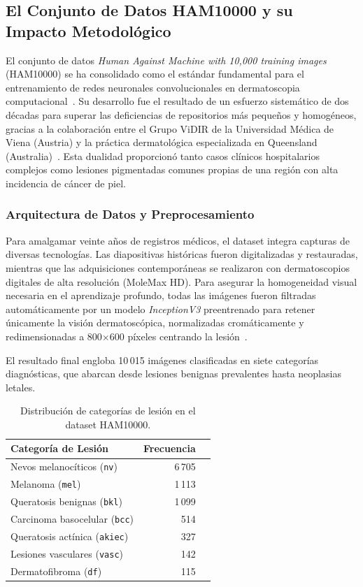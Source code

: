 \subsection{El Conjunto de Datos HAM10000 y su Impacto Metodológico}\label{sec:ham10000}

El conjunto de datos \textit{Human Against Machine with 10,000 training images} (HAM10000) se ha consolidado 
como el estándar fundamental para el entrenamiento de redes neuronales convolucionales en dermatoscopia 
computacional~\cite{datasetninja_ham10000,arxiv_ham10000}. Su desarrollo fue el resultado de un esfuerzo 
sistemático de dos décadas para superar las deficiencias de repositorios más pequeños y homogéneos, 
gracias a la colaboración entre el Grupo ViDIR de la Universidad Médica de Viena (Austria) y la práctica 
dermatológica especializada en Queensland (Australia)~\cite{pmc_ham10000}. Esta dualidad proporcionó tanto 
casos clínicos hospitalarios complejos como lesiones pigmentadas comunes propias de una región con alta 
incidencia de cáncer de piel.

\subsubsection{Arquitectura de Datos y Preprocesamiento}

Para amalgamar veinte años de registros médicos, el dataset integra capturas de diversas tecnologías. 
Las diapositivas históricas fueron digitalizadas y restauradas, mientras que las adquisiciones 
contemporáneas se realizaron con dermatoscopios digitales de alta resolución (MoleMax HD). Para asegurar 
la homogeneidad visual necesaria en el aprendizaje profundo, todas las imágenes fueron filtradas 
automáticamente por un modelo \textit{InceptionV3} preentrenado para retener únicamente la visión 
dermatoscópica, normalizadas cromáticamente y redimensionadas a 800$\times$600 píxeles centrando 
la lesión~\cite{pmc_ham10000}.

El resultado final engloba 10\,015 imágenes clasificadas en siete categorías diagnósticas, que abarcan 
desde lesiones benignas prevalentes hasta neoplasias letales.

\begin{table}[htbp]
\centering
\caption{Distribución de categorías de lesión en el dataset HAM10000.}\label{tab:ham10000}
\begin{tabular}{lrl}
\toprule
\textbf{Categoría de Lesión} & \textbf{Frecuencia} \\
\midrule
Nevos melanocíticos (\texttt{nv}) & 6\,705 \\
Melanoma (\texttt{mel}) & 1\,113  \\
Queratosis benignas (\texttt{bkl}) & 1\,099 \\
Carcinoma basocelular (\texttt{bcc}) & 514  \\
Queratosis actínica (\texttt{akiec}) & 327  \\
Lesiones vasculares (\texttt{vasc}) & 142  \\
Dermatofibroma (\texttt{df}) & 115  \\
\bottomrule
\end{tabular}
\end{table}

